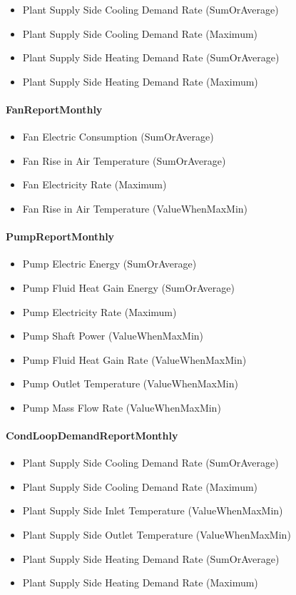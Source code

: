 \begin{itemize}
\item
  Plant Supply Side Cooling Demand Rate (SumOrAverage)
\item
  Plant Supply Side Cooling Demand Rate (Maximum)
\item
  Plant Supply Side Heating Demand Rate (SumOrAverage)
\item
  Plant Supply Side Heating Demand Rate (Maximum)
\end{itemize}

\paragraph{FanReportMonthly}\label{fanreportmonthly}

\begin{itemize}
\item
  Fan Electric Consumption (SumOrAverage)
\item
  Fan Rise in Air Temperature (SumOrAverage)
\item
  Fan Electricity Rate (Maximum)
\item
  Fan Rise in Air Temperature (ValueWhenMaxMin)
\end{itemize}

\paragraph{PumpReportMonthly}\label{pumpreportmonthly}

\begin{itemize}
\item
  Pump Electric Energy (SumOrAverage)
\item
  Pump Fluid Heat Gain Energy (SumOrAverage)
\item
  Pump Electricity Rate (Maximum)
\item
  Pump Shaft Power (ValueWhenMaxMin)
\item
  Pump Fluid Heat Gain Rate (ValueWhenMaxMin)
\item
  Pump Outlet Temperature (ValueWhenMaxMin)
\item
  Pump Mass Flow Rate (ValueWhenMaxMin)
\end{itemize}

\paragraph{CondLoopDemandReportMonthly}\label{condloopdemandreportmonthly}

\begin{itemize}
\item
  Plant Supply Side Cooling Demand Rate (SumOrAverage)
\item
  Plant Supply Side Cooling Demand Rate (Maximum)
\item
  Plant Supply Side Inlet Temperature (ValueWhenMaxMin)
\item
  Plant Supply Side Outlet Temperature (ValueWhenMaxMin)
\item
  Plant Supply Side Heating Demand Rate (SumOrAverage)
\item
  Plant Supply Side Heating Demand Rate (Maximum)
\end{itemize}

